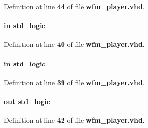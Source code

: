 Definition at line {\bf 44} of file {\bf wfm\+\_\+player.\+vhd}.

\paragraph[{wcmd\+\_\+rdy}]{ {\bfseries \textcolor{keywordflow}{in}\textcolor{vhdlchar}{ }} {\bfseries \textcolor{comment}{std\+\_\+logic}\textcolor{vhdlchar}{ }} \hspace{0.3cm}{\ttfamily [Port]}}\label{classwfm__player_a70cfe6939e8d71def35eeaeff9b081e5}


Definition at line {\bf 40} of file {\bf wfm\+\_\+player.\+vhd}.

\paragraph[{wcmd\+\_\+reset\+\_\+n}]{ {\bfseries \textcolor{keywordflow}{in}\textcolor{vhdlchar}{ }} {\bfseries \textcolor{comment}{std\+\_\+logic}\textcolor{vhdlchar}{ }} \hspace{0.3cm}{\ttfamily [Port]}}\label{classwfm__player_aac7e87fea52e3113a81259b78798028c}


Definition at line {\bf 39} of file {\bf wfm\+\_\+player.\+vhd}.

\paragraph[{wcmd\+\_\+wr}]{ {\bfseries \textcolor{keywordflow}{out}\textcolor{vhdlchar}{ }} {\bfseries \textcolor{comment}{std\+\_\+logic}\textcolor{vhdlchar}{ }} \hspace{0.3cm}{\ttfamily [Port]}}\label{classwfm__player_a765b8764f626115d2a60e0cd8cdaf258}


Definition at line {\bf 42} of file {\bf wfm\+\_\+player.\+vhd}.

